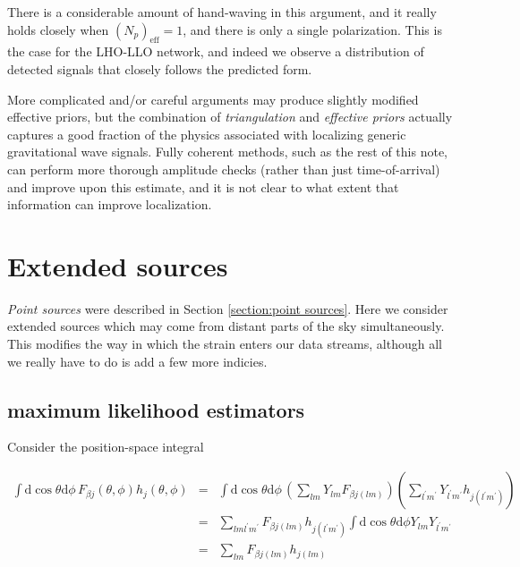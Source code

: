 \documentclass[10pt]{article}
\begin{document}
There is a considerable amount of hand-waving in this argument, and it really holds closely when $\left(N_{p}\right)_{\mathrm{eff}} = 1$, and there is only a single polarization. This is the case for the LHO-LLO network, and indeed we observe a distribution of detected signals that closely follows the predicted form. 

More complicated and/or careful arguments may produce slightly modified effective priors, but the combination of \emph{triangulation} and \emph{effective priors} actually captures a good fraction of the physics associated with localizing generic gravitational wave signals. Fully coherent methods, such as the rest of this note, can perform more thorough amplitude checks (rather than just time-of-arrival) and improve upon this estimate, and it is not clear to what extent that information can improve localization.

\section{Extended sources}\label{section:extended sources}

\emph{Point sources} were described in Section \ref{section:point sources}. Here we consider extended sources which may come from distant parts of the sky simultaneously. This modifies the way in which the strain enters our data streams, although all we really have to do is add a few more indicies. 

\subsection{maximum likelihood estimators}

Consider the position-space integral

\begin{eqnarray}
\int \mathrm{d}\cos\theta \mathrm{d}\phi\, F_{\beta j}\left(\theta,\phi\right) h_{j}\left(\theta,\phi\right) & = & \int \mathrm{d}\cos\theta \mathrm{d}\phi\, \left( \sum\limits_{lm} Y_{lm} F_{\beta j (lm)} \right) \left( \sum\limits_{l^\prime m^\prime} Y_{l^\prime m^\prime} h_{j (l^\prime m^\prime)} \right) \\
& = & \sum\limits_{l m l^\prime m^\prime} F_{\beta j (lm)}  h_{j (l^\prime m^\prime)} \int \mathrm{d}\cos\theta \mathrm{d}\phi Y_{lm} Y_{l^\prime m^\prime} \\
& = & \sum\limits_{lm} F_{\beta j (l m)} h_{j (l m)}
\end{eqnarray}
\end{document}
